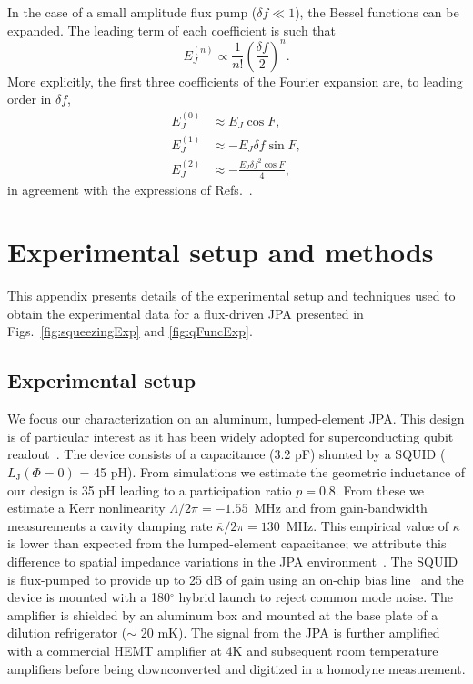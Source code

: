 \documentclass[pra,twocolumn,superscriptaddress]{revtex4-1}
\newcommand{\df}[0]{\delta\!f}
\newcommand{\kappaTot}[0]{\overline{\kappa}}
\newcommand{\parO}[1]{\left(#1\right)}
\begin{document}
In the case of a small amplitude flux pump ($\df \ll 1$), the Bessel functions can be expanded. The leading term of each coefficient is such that
\begin{equation}
	E_J^{(n)} \propto \frac{1}{n!} \parO{\frac{\df}{2}}^n.
\end{equation}
 More explicitly, the first three coefficients of the Fourier expansion are, to leading order in $\df$, 
% 
\begin{align}
	E_J^{(0)} &\approx  E_J \cos F
	,\\
	E_J^{(1)} &\approx - E_J \df \sin F
	,\\
	E_J^{(2)} &\approx  - \frac{E_J \df^2 \cos F}{4}
	,
\end{align}
in agreement with the expressions of Refs.~\cite{Wustmann:2013uq,Krantz:2013vn}.

\section{Experimental setup and methods}\label{App::exp}
This appendix presents details of the experimental setup and techniques used to obtain the experimental data for a flux-driven JPA presented in Figs.~\ref{fig:squeezingExp} and \ref{fig:qFuncExp}. 

\subsection{Experimental setup}
We focus our characterization on an aluminum, lumped-element JPA.  This design is of particular interest as it has been widely adopted for superconducting qubit readout~\cite{Vijay:2011ve,Mutus:2013yu,Murch:2013uq}.  The device consists of a capacitance (3.2 pF) shunted by a SQUID ($L_\mathrm{J}\left(\Phi=0\right)$ = 45 pH).  From simulations we estimate the geometric inductance of our design is 35 pH leading to a participation ratio $p=0.8$. From these we estimate a Kerr nonlinearity $\Lambda/2\pi= -1.55$~MHz and from gain-bandwidth measurements a cavity damping rate $\kappaTot/2 \pi = 130$~MHz. 
% 
This empirical value of $\kappa$ is lower than expected from the lumped-element capacitance; we attribute this difference to spatial impedance variations in the JPA environment~\cite{Mutus:2014ve}.
% 
The SQUID is flux-pumped to provide up to 25 dB of gain using an on-chip bias line~\cite{Yamamoto:2008dp} and the device is mounted with a 180$^{\circ}$ hybrid launch to reject common mode noise. 
The amplifier is shielded by an aluminum box and mounted at the base plate of a dilution refrigerator ($\sim$ 20 mK).  The signal from the JPA is further amplified with a commercial HEMT amplifier at 4K and subsequent room temperature amplifiers before being downconverted and digitized in a homodyne measurement. 
\end{document}
